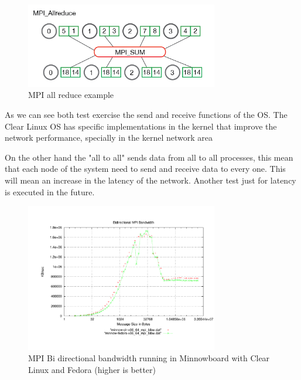 \begin{figure}[H]
\centering
\includegraphics[width=0.75\textwidth]{images/mpi_allreduce_1.png}
\caption{MPI all reduce example }
\label{mpi_allreduce_example}
\end{figure}

As we can see both test exercise the send and receive functions of the OS. The
Clear Linux OS has specific implementations in the kernel that improve the
network performance, specially in the kernel network area

On the other hand the "all to all" sends data from all to all processes, this
mean that each node of the system need to send and receive data to every one.
This will mean an increase in the latency of the network. Another test just for
latency is executed in the future. 


\begin{figure}[H]
\centering
\includegraphics[width=0.75\textwidth]{images/mpbench_clr_experiments/mpi_bibw.pdf}
\caption{MPI Bi directional bandwidth running in Minnowboard with Clear Linux
and Fedora (higher is better)}
\label{mpi_bibw_clr_fedora}
\end{figure}


